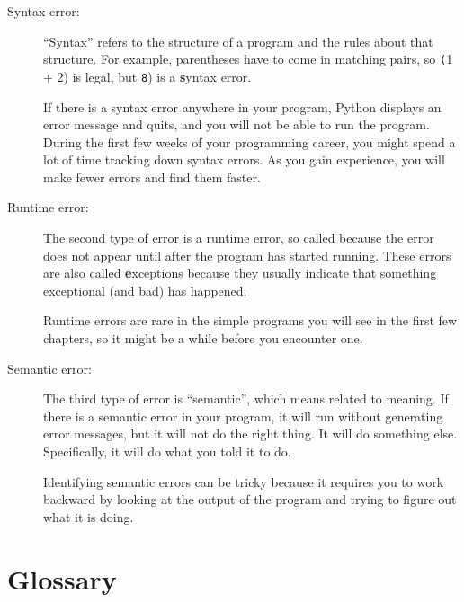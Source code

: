 \documentclass[
DIV=11,
fontsize=12,
twoside,
headinclude=false,
titlepage=firstiscover,
abstract=true,
headsepline=true,
footsepline=true,
chapterprefix=true, %
headings=big,
bibliography=totoc,%
captions=tableheading
]{scrbook}
\theoremstyle{definition}
\begin{document}
\begin{description}

\item[Syntax error:] ``Syntax'' refers to the structure of a program
  and the rules about that structure.  For example, parentheses have
  to come in matching pairs, so {\texttt (1 + 2)} is legal, but {\texttt 8)}
  is a {\textbf syntax error}.   

If there is a syntax error
anywhere in your program, Python displays an error message and quits,
and you will not be able to run the program.  During the first few
weeks of your programming career, you might spend a lot of
time tracking down syntax errors.  As you gain experience, you will
make fewer errors and find them faster.


\item[Runtime error:] The second type of error is a runtime error, so
  called because the error does not appear until after the program has
  started running.  These errors are also called {\textbf exceptions}
  because they usually indicate that something exceptional (and bad)
  has happened.   
    

Runtime errors are rare in the simple programs you will see in the
first few chapters, so it might be a while before you encounter one.


\item[Semantic error:] The third type of error is ``semantic'', which
  means related to meaning.  If there is a semantic error in your
  program, it will run without generating error messages, but it will
  not do the right thing.  It will do something else.  Specifically,
  it will do what you told it to do.  
   

Identifying semantic errors can be tricky because it requires you to work
backward by looking at the output of the program and trying to figure
out what it is doing.

\end{description}


\section{Glossary}
\end{document}
